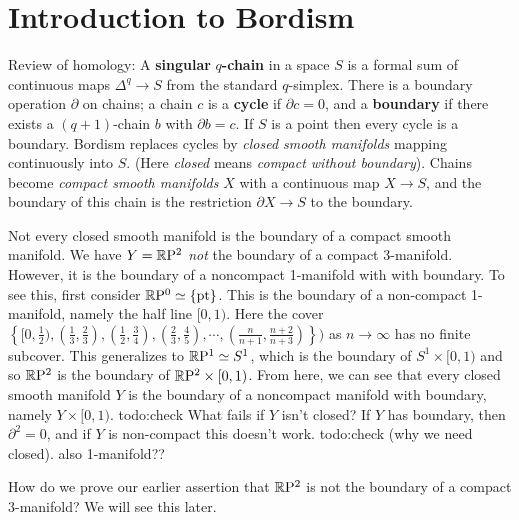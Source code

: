 \section{Introduction to Bordism} 

Review of homology: A \textbf{singular} $q$\textbf{-chain} in a space $S$ is a formal sum of continuous maps $\Delta ^q \to S$ from the standard $q$-simplex. There is a boundary operation $\partial $ on chains; a chain $c$ is a \textbf{cycle} if $\partial c=0$, and a \textbf{boundary}  if there exists a $(q+1)$-chain $b$ with $\partial b=c$. If $S$ is a point then every cycle is a boundary. Bordism replaces cycles by \emph{closed smooth manifolds} mapping continuously into $S$. (Here \emph{closed} means \emph{compact without boundary}). Chains become \emph{compact smooth manifolds}  $X$ with a continuous map $X \to S$, and the boundary of this chain is the restriction $\partial  X \to S$ to the boundary.

\begin{example}
    Not every closed smooth manifold is the boundary of a compact smooth manifold. We have $Y= \mathbb{R} \mathrm P^2$ \emph{not} the boundary of a compact 3-manifold. However, it is the boundary of a noncompact 1-manifold with with boundary. To see this, first consider $\mathbb{R} \mathrm P^0\simeq \{\text{pt} \} $. This is the boundary of a non-compact 1-manifold, namely the half line $[0,1)$. Here the cover $\left\{[0,\frac{1}{2}),(\frac{1}{3},\frac{2}{3}),(\frac{1}{2},\frac{3}{4}),(\frac{2}{3},\frac{4}{5}),\cdots ,(\frac{n}{n+1},\frac{n+2}{n+3})\right\}) $ as $n\to \infty$ has no finite subcover. This generalizes to $\mathbb{R} \mathrm P^1\simeq S^1 $, which is the boundary of $S^1  \times [0,1)$ and so $\mathbb{R} \mathrm P^2$ is the boundary of $\mathbb{R} \mathrm P^2 \times [0,1)$. From here, we can see that every closed smooth manifold $Y$ is the boundary of a noncompact manifold with boundary, namely $Y \times [0,1)$. {\color{red}todo:check}  What fails if $Y$ isn't closed? If $Y$ has boundary, then $\partial ^2=0$, and if $Y$ is non-compact this doesn't work. {\color{red}todo:check (why we need closed). also 1-manifold??} 

    How do we prove our earlier assertion that $\mathbb{R} \mathrm P^2$ is not the boundary of a compact 3-manifold? We will see this later.
\end{example}


